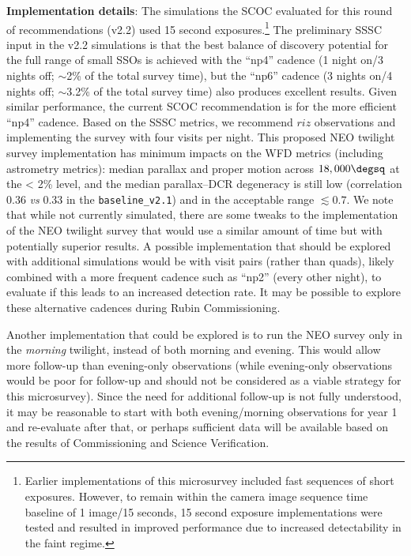 {\bf Implementation details}: 
The simulations the SCOC evaluated for this round of recommendations (v2.2) used 15 second exposures.\footnote{Earlier implementations of this microsurvey included fast sequences of short exposures. However, to remain within the camera image sequence time baseline of 1 image/15 seconds, 15 second exposure implementations were tested and resulted in improved performance due to increased detectability in the faint regime.} The preliminary SSSC input in the v2.2 simulations is that the best balance of discovery potential for the full range of small SSOs is achieved with the ``np4'' cadence (1 night on/3 nights off; $\sim$2\% of the total survey time), but the ``np6'' cadence (3 nights on/4 nights off; $\sim$3.2\% of the total survey time) also produces excellent results. Given similar performance, the current SCOC recommendation is for the more efficient ``np4'' cadence. %
Based on the SSSC metrics, we recommend $riz$ observations and implementing the survey with four visits per night. This proposed NEO twilight survey implementation has minimum impacts on the WFD metrics (including astrometry metrics): median parallax and proper motion across $18,000 \degsq$ at the < 2\% level, and the median parallax–DCR degeneracy is still low (correlation 0.36 \textit{vs} 0.33 in the \texttt{baseline\_v2.1}) and in the acceptable range $\lesssim 0.7$. 
We note that while not currently simulated, there are some tweaks to the implementation of the NEO twilight survey that would use a similar amount of time but with potentially superior results. A possible implementation that should be explored with additional simulations would be with visit pairs (rather than quads), likely combined with a more frequent cadence such as ``np2'' (every other night), to evaluate if this leads to an increased detection rate. It may be possible to explore these alternative cadences during Rubin Commissioning.

Another implementation that could be explored is to run the NEO survey only in the \emph{morning} twilight, instead of both morning and evening. This would allow more follow-up than evening-only observations (while evening-only observations would be poor for follow-up and should not be considered as a viable strategy for this microsurvey). Since the need for additional follow-up is not fully understood, it may be reasonable to start with both evening/morning observations for year 1 and re-evaluate after that, or perhaps sufficient data will be available based on the results of Commissioning and Science Verification.

